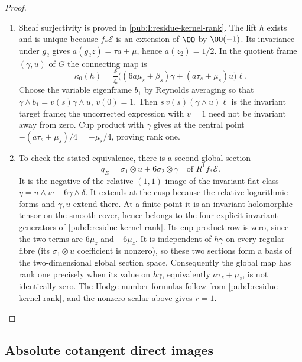 \begin{proof}
\begin{enumerate}[label=\arabic*.,leftmargin=*]
\item Sheaf surjectivity is proved in
\cref{pub:I:residue-kernel-rank}. The lift $h$ exists and is unique because $f_*\mathcal E$ is an
extension of $\OO$ by $\OO(-1)$.  Its invariance under $g_2$ gives
$a(g_2z)=\tau a+\mu$, hence $a(z_2)=1/2$.
In the quotient frame $(\gamma,u)$ of $G$ the connecting map is
\[
\kappa_0(h)=\frac{s}{4}
\bigl((6a\mu_s+\beta_s)\gamma+(a\tau_s+\mu_s)u\bigr)\ell.
\]
Choose the variable eigenframe $b_1$ by Reynolds averaging so that
$\gamma\wedge b_1=v(s)\gamma\wedge u$, $v(0)=1$.
Then $s\,v(s)(\gamma\wedge u)\ell$ is the invariant
target frame; the uncorrected expression with $v=1$ need not be
invariant away from zero.  Cup product with $\gamma$ gives at the
central point $-(a\tau_s+\mu_s)/4=-\mu_s/4$, proving rank one.

\item To check the stated equivalence, there is a second global section
\[
q_E=\sigma_1\otimes u+6\sigma_2\otimes\gamma
\quad\text{of }R^1f_*\mathcal E.
\]
It is the negative of the relative $(1,1)$ image of the invariant
flat class $\eta=u\wedge w+6\gamma\wedge\delta$.
It extends at the cusp because the relative logarithmic forms and
$\gamma,u$ extend there.  At a finite point it is an invariant
holomorphic tensor on the smooth cover, hence belongs to the four
explicit invariant generators of \cref{pub:I:residue-kernel-rank}.  Its cup-product row is zero,
since the two terms are $6\mu_z$ and $-6\mu_z$.
It is independent of $h\gamma$ on every regular fibre (its
$\sigma_1\otimes u$ coefficient is nonzero), so these two sections
form a basis of the two-dimensional global section space.
Consequently the global map has rank one precisely when its value
on $h\gamma$, equivalently $a\tau_z+\mu_z$, is not identically
zero. The Hodge-number formulas follow from
\cref{pub:I:residue-kernel-rank}, and the nonzero scalar above gives
$r=1$.
\end{enumerate}
\end{proof}

\subsection{Absolute cotangent direct images}


